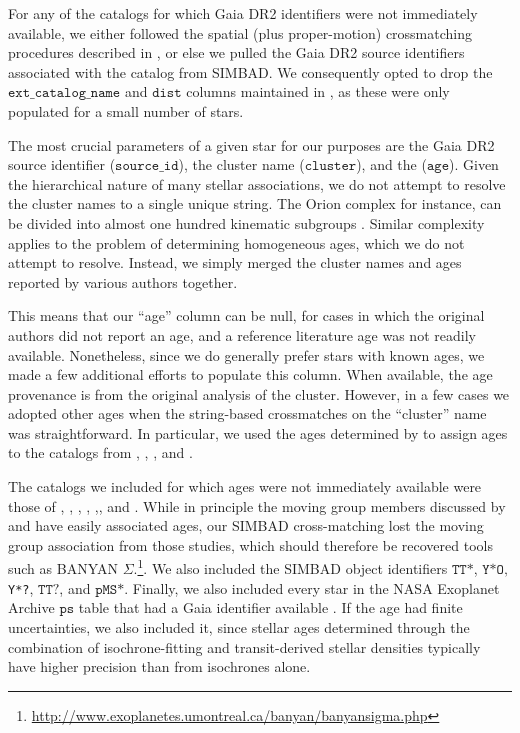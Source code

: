 \documentclass[12pt,modern,twocolumn,tighten]{aastex63}
\begin{document}
For any of the catalogs for which Gaia DR2 identifiers were not
immediately available, we either followed the spatial (plus
proper-motion) crossmatching procedures described in
\citet{bouma_cdipsI_2019}, or else we pulled the Gaia DR2 source
identifiers associated with the catalog from SIMBAD.  We consequently
opted to drop the $\texttt{ext\_catalog\_name}$ and $\texttt{dist}$
columns maintained in \citet{bouma_cdipsI_2019}, as these were only
populated for a small number of stars.

The most crucial parameters of a given star for our purposes are the
Gaia DR2 source identifier ($\texttt{source\_id}$), the cluster name
($\texttt{cluster}$), and the ($\texttt{age}$).  Given the
hierarchical nature of many stellar associations, we do not attempt to
resolve the cluster names to a single unique string.  The Orion
complex for instance, can be divided into almost one hundred kinematic
subgroups \citep{kounkel_apogee2_2018}.  Similar complexity applies to
the problem of determining homogeneous ages, which we do not attempt
to resolve.  Instead, we simply merged the cluster names and ages
reported by various authors together.

This means that our ``age'' column can be null, for cases in which the
original authors did not report an age, and a reference literature age
was not readily available.  Nonetheless, since we do generally prefer
stars with known ages, we made a few additional efforts to populate
this column.  When available, the age provenance is from the original
analysis of the cluster.  However, in a few cases we adopted other
ages when the string-based crossmatches on the ``cluster'' name was
straightforward.  In particular, we used the ages determined by
\citet{CantatGaudin2020b} to assign ages to the catalogs from
\citet{GaiaCollaboration2018}, \citet{CantatGaudin2018a},
\citet{CastroGinard2020}, and \citet{CantatGaudin2020a}.

The catalogs we included for which ages were not immediately available
were those of \citet{CottenSong2016}, \citet{Oh2017},
\citet{Zari2018}, \citet{Gagne2018a},
\citet{Gagne2018b},\citet{Gagne2018c}, and \citet{Ujjwal2020}.  While
in principle the moving group members discussed by
\citet{Gagne2018a,Gagne2018b,Gagne2018c} and \citet{Ujjwal2020} have
easily associated ages, our SIMBAD cross-matching lost the moving
group association from those studies, which should therefore be
recovered tools such as BANYAN
$\Sigma$.\footnote{\url{http://www.exoplanetes.umontreal.ca/banyan/banyansigma.php}}.
We also included the SIMBAD object identifiers $\texttt{TT*}$,
$\texttt{Y*O}, $\texttt{Y*?}, $\texttt{TT?}$, and $\texttt{pMS*}$.
Finally, we also included every star in the NASA Exoplanet Archive
$\texttt{ps}$ table that had a Gaia identifier available
\citep{NASAExoArchive_ps_20210506}.  If the age had finite
uncertainties, we also included it, since stellar ages determined
through the combination of isochrone-fitting and transit-derived
stellar densities typically have higher precision than from isochrones
alone.
\end{document}
